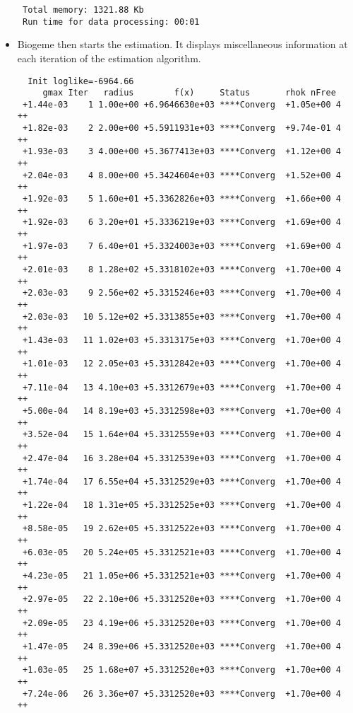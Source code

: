 \documentclass[12pt]{memoir}
\begin{document}
\begin{itemize}
{\begin{verbatim}
 Total memory: 1321.88 Kb
 Run time for data processing: 00:01
\end{verbatim}
}
\item Biogeme then starts the estimation. It displays miscellaneous
information at each iteration of the estimation algorithm.
{\footnotesize
\begin{verbatim}
  Init loglike=-6964.66
     gmax Iter   radius        f(x)     Status       rhok nFree
 +1.44e-03    1 1.00e+00 +6.9646630e+03 ****Converg  +1.05e+00 4  ++
 +1.82e-03    2 2.00e+00 +5.5911931e+03 ****Converg  +9.74e-01 4  ++
 +1.93e-03    3 4.00e+00 +5.3677413e+03 ****Converg  +1.12e+00 4  ++
 +2.04e-03    4 8.00e+00 +5.3424604e+03 ****Converg  +1.52e+00 4  ++
 +1.92e-03    5 1.60e+01 +5.3362826e+03 ****Converg  +1.66e+00 4  ++
 +1.92e-03    6 3.20e+01 +5.3336219e+03 ****Converg  +1.69e+00 4  ++
 +1.97e-03    7 6.40e+01 +5.3324003e+03 ****Converg  +1.69e+00 4  ++
 +2.01e-03    8 1.28e+02 +5.3318102e+03 ****Converg  +1.70e+00 4  ++
 +2.03e-03    9 2.56e+02 +5.3315246e+03 ****Converg  +1.70e+00 4  ++
 +2.03e-03   10 5.12e+02 +5.3313855e+03 ****Converg  +1.70e+00 4  ++
 +1.43e-03   11 1.02e+03 +5.3313175e+03 ****Converg  +1.70e+00 4  ++
 +1.01e-03   12 2.05e+03 +5.3312842e+03 ****Converg  +1.70e+00 4  ++
 +7.11e-04   13 4.10e+03 +5.3312679e+03 ****Converg  +1.70e+00 4  ++
 +5.00e-04   14 8.19e+03 +5.3312598e+03 ****Converg  +1.70e+00 4  ++
 +3.52e-04   15 1.64e+04 +5.3312559e+03 ****Converg  +1.70e+00 4  ++
 +2.47e-04   16 3.28e+04 +5.3312539e+03 ****Converg  +1.70e+00 4  ++
 +1.74e-04   17 6.55e+04 +5.3312529e+03 ****Converg  +1.70e+00 4  ++
 +1.22e-04   18 1.31e+05 +5.3312525e+03 ****Converg  +1.70e+00 4  ++
 +8.58e-05   19 2.62e+05 +5.3312522e+03 ****Converg  +1.70e+00 4  ++
 +6.03e-05   20 5.24e+05 +5.3312521e+03 ****Converg  +1.70e+00 4  ++
 +4.23e-05   21 1.05e+06 +5.3312521e+03 ****Converg  +1.70e+00 4  ++
 +2.97e-05   22 2.10e+06 +5.3312520e+03 ****Converg  +1.70e+00 4  ++
 +2.09e-05   23 4.19e+06 +5.3312520e+03 ****Converg  +1.70e+00 4  ++
 +1.47e-05   24 8.39e+06 +5.3312520e+03 ****Converg  +1.70e+00 4  ++
 +1.03e-05   25 1.68e+07 +5.3312520e+03 ****Converg  +1.70e+00 4  ++
 +7.24e-06   26 3.36e+07 +5.3312520e+03 ****Converg  +1.70e+00 4  ++


\end{verbatim}}
\end{itemize}
\end{document}
